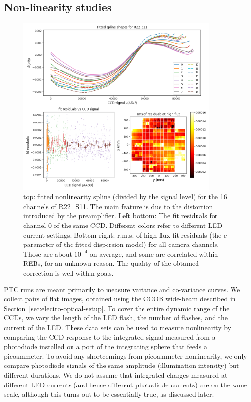 \subsection{Non-linearity studies}\label{nonlinearity}
\begin{figure}[ht]
\begin{centering}
\includegraphics[width=0.9\textwidth]{figures/nonlin_plots.png}
\end{centering}
\caption{top: fitted nonlinearity spline (divided by the signal level) for the 16 channels of R22\_S11. The main feature is due to the distortion introduced by the preamplifier. Left bottom: The fit residuals for channel 0 of the same CCD. Different colors refer to different LED current settings. Bottom right: r.m.s. of high-flux fit residuals (the $c$ parameter of the fitted dispersion model) for all camera channels. Those are about $10^{-4}$ on average, and some are correlated within REBs, for an unknown reason. The quality of the obtained correction is well within goals.\label{fig:nonlin_model}}

\end{figure}

PTC runs are meant primarily to measure variance and co-variance curves. We collect pairs of flat images, obtained using the CCOB wide-beam described in Section~\ref{sec:electro-optical-setup}. To cover the entire dynamic range of the CCDs, we vary the length of the LED flash, the number of flashes, and the current of the LED. These data sets can be used to measure nonlinearity by comparing the CCD response to the integrated signal measured from a photodiode installed on a port of the integrating sphere that feeds a picoammeter. To avoid any shortcomings from picoammeter nonlinearity, we only compare photodiode signals of the same amplitude (illumination intensity) but different durations. We do not assume that integrated charges measured at different LED currents (and hence different photodiode currents) are on the same scale, although this turns out to be essentially true, as discussed later. 

